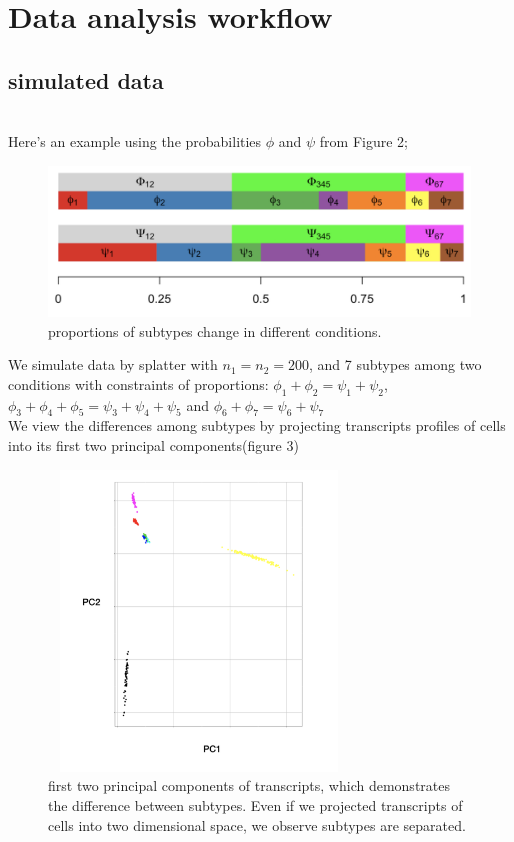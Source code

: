 \documentclass[11pt]{amsart}
\begin{document}
\section{Data analysis workflow} 
\subsection{simulated data}\hfill\\
Here's an example using the probabilities $\phi$ and $\psi$ from Figure 2;
\begin{figure}[h!]
  \includegraphics[height = 4cm, width=\linewidth]{prop.png}
  \caption{proportions of subtypes change in different conditions.}
  \label{fig:2}
\end{figure}
We simulate data by splatter\cite{ref:Zappia} with $n_1=n_2=200$, and 7 subtypes among two conditions with constraints of proportions: $\phi_1 + \phi_2 = \psi_1 + \psi_2$, $\phi_3 + \phi_4 +\phi_5 = \psi_3 + \psi_4 + \psi_5$ and $\phi_6 + \phi_7 = \psi_6 + \psi_7$\\
We view the differences among subtypes by projecting transcripts profiles of cells into its first two principal components(figure 3)
\begin{figure}[h!]
  \includegraphics[height=8cm, width=8cm]{pca.png}
  \caption{first two principal components of transcripts, which demonstrates the difference between subtypes. Even if we projected transcripts of cells into two dimensional space, we observe subtypes are separated.}
  \label{fig:4}
\end{figure}
\end{document}
